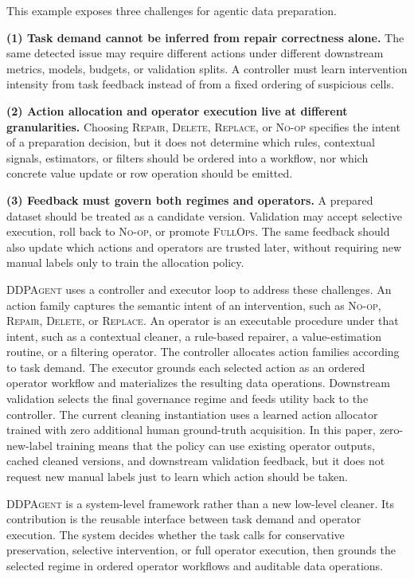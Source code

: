 \documentclass[sigconf, nonacm]{acmart}
\newcommand{\sys}{\textsc{DDPAgent}\xspace}
\newcommand{\noop}{\textsc{No-op}\xspace}
\newcommand{\repair}{\textsc{Repair}\xspace}
\newcommand{\deleteop}{\textsc{Delete}\xspace}
\newcommand{\replaceop}{\textsc{Replace}\xspace}
\newcommand{\fullops}{\textsc{FullOps}\xspace}
\begin{document}
This example exposes three challenges for agentic data preparation.

\noindent\textbf{(1) Task demand cannot be inferred from repair correctness alone.}
The same detected issue may require different actions under different downstream metrics, models, budgets, or validation splits. A controller must learn intervention intensity from task feedback instead of from a fixed ordering of suspicious cells.

\noindent\textbf{(2) Action allocation and operator execution live at different granularities.}
Choosing \repair, \deleteop, \replaceop, or \noop specifies the intent of a preparation decision, but it does not determine which rules, contextual signals, estimators, or filters should be ordered into a workflow, nor which concrete value update or row operation should be emitted.

\noindent\textbf{(3) Feedback must govern both regimes and operators.}
A prepared dataset should be treated as a candidate version. Validation may accept selective execution, roll back to \noop, or promote \fullops. The same feedback should also update which actions and operators are trusted later, without requiring new manual labels only to train the allocation policy.

\sys uses a controller and executor loop to address these challenges. An action family captures the semantic intent of an intervention, such as \noop, \repair, \deleteop, or \replaceop. An operator is an executable procedure under that intent, such as a contextual cleaner, a rule-based repairer, a value-estimation routine, or a filtering operator. The controller allocates action families according to task demand. The executor grounds each selected action as an ordered operator workflow and materializes the resulting data operations. Downstream validation selects the final governance regime and feeds utility back to the controller. The current cleaning instantiation uses a learned action allocator trained with zero additional human ground-truth acquisition. In this paper, zero-new-label training means that the policy can use existing operator outputs, cached cleaned versions, and downstream validation feedback, but it does not request new manual labels just to learn which action should be taken.

\sys is a system-level framework rather than a new low-level cleaner. Its contribution is the reusable interface between task demand and operator execution. The system decides whether the task calls for conservative preservation, selective intervention, or full operator execution, then grounds the selected regime in ordered operator workflows and auditable data operations.
\end{document}
